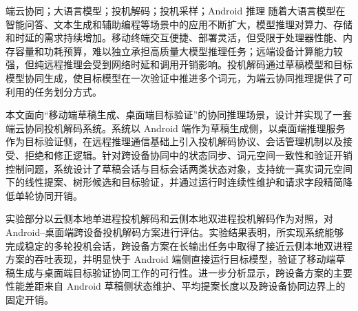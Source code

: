 \begin{中文摘要}{端云协同；大语言模型；投机解码；投机采样；Android 推理}
随着大语言模型在智能问答、文本生成和辅助编程等场景中的应用不断扩大，模型推理对算力、存储和时延的需求持续增加。移动终端交互便捷、部署灵活，但受限于处理器性能、内存容量和功耗预算，难以独立承担高质量大模型推理任务；远端设备计算能力较强，但纯远程推理会受到网络时延和调用开销影响。投机解码通过草稿模型和目标模型协同生成，使目标模型在一次验证中推进多个词元，为端云协同推理提供了可利用的任务划分方式。

本文面向“移动端草稿生成、桌面端目标验证”的协同推理场景，设计并实现了一套端云协同投机解码系统。系统以 Android 端作为草稿生成侧，以桌面端推理服务作为目标验证侧，在远程推理通信基础上引入投机解码协议、会话管理机制以及接受、拒绝和修正逻辑。针对跨设备协同中的状态同步、词元空间一致性和验证开销控制问题，系统设计了草稿会话与目标会话两类状态对象，支持统一真实词元空间下的线性提案、树形候选和目标验证，并通过运行时连续性维护和请求字段精简降低单轮协同开销。

实验部分以云侧本地单进程投机解码和云侧本地双进程投机解码作为对照，对 Android--桌面端跨设备投机解码方案进行评估。实验结果表明，所实现系统能够完成稳定的多轮投机会话，跨设备方案在长输出任务中取得了接近云侧本地双进程方案的吞吐表现，并明显快于 Android 端侧直接运行目标模型，验证了移动端草稿生成与桌面端目标验证协同工作的可行性。进一步分析显示，跨设备方案的主要性能差距来自 Android 草稿侧状态维护、平均提案长度以及跨设备协同边界上的固定开销。
\end{中文摘要}

